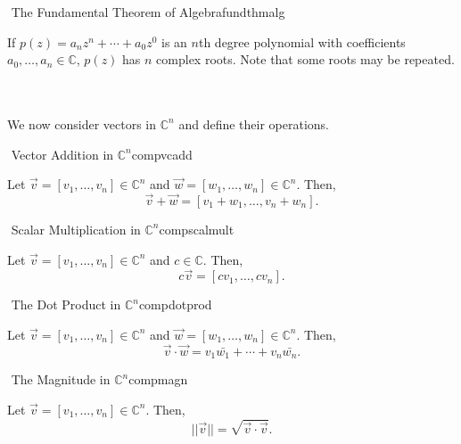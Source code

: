         \begin{theorem}{\Stop\,\,The Fundamental Theorem of Algebra}{fundthmalg}
            
            If \(p(z)=a_nz^n+\cdots+a_0z^0\) is an \(n\)th degree polynomial with coefficients \(a_0,\ldots,a_n\in\mathbb{C}\), \(p(z)\) has \(n\) complex roots. Note that some roots may be repeated.

        \end{theorem}
        \pagebreak
        \vphantom
        \\
        \\
        We now consider vectors in \(\mathbb{C}^n\) and define their operations.
        \begin{definition}{\Stop\,\,Vector Addition in \(\mathbb{C}^n\)}{compvcadd}

            Let \(\vec{v}=[v_1,\ldots,v_n]\in\mathbb{C}^n\) and \(\vec{w}=[w_1,\ldots,w_n]\in\mathbb{C}^n\). Then,
            \begin{equation*}
                \vec{v}+\vec{w}=[v_1+w_1,\ldots,v_n+w_n].
            \end{equation*}

        \end{definition}
        \begin{definition}{\Stop\,\,Scalar Multiplication in \(\mathbb{C}^n\)}{compscalmult}

            Let \(\vec{v}=[v_1,\ldots,v_n]\in\mathbb{C}^n\) and \(c\in\mathbb{C}\). Then,
            \begin{equation*}
                c\vec{v}=[cv_1,\ldots,cv_n].
            \end{equation*}

        \end{definition}
        \begin{definition}{\Stop\,\,The Dot Product in \(\mathbb{C}^n\)}{compdotprod}

            Let \(\vec{v}=[v_1,\ldots,v_n]\in\mathbb{C}^n\) and \(\vec{w}=[w_1,\ldots,w_n]\in\mathbb{C}^n\). Then,
            \begin{equation*}
                \vec{v}\cdot\vec{w}=v_1\bar{w_1}+\cdots+v_n\bar{w_n}.
            \end{equation*}

        \end{definition}
        \begin{definition}{\Stop\,\,The Magnitude in \(\mathbb{C}^n\)}{compmagn}

            Let \(\vec{v}=[v_1,\ldots,v_n]\in\mathbb{C}^n\). Then,
            \begin{equation*}
                ||\vec{v}||=\sqrt{\vec{v}\cdot\vec{v}}.
            \end{equation*}

        \end{definition}
